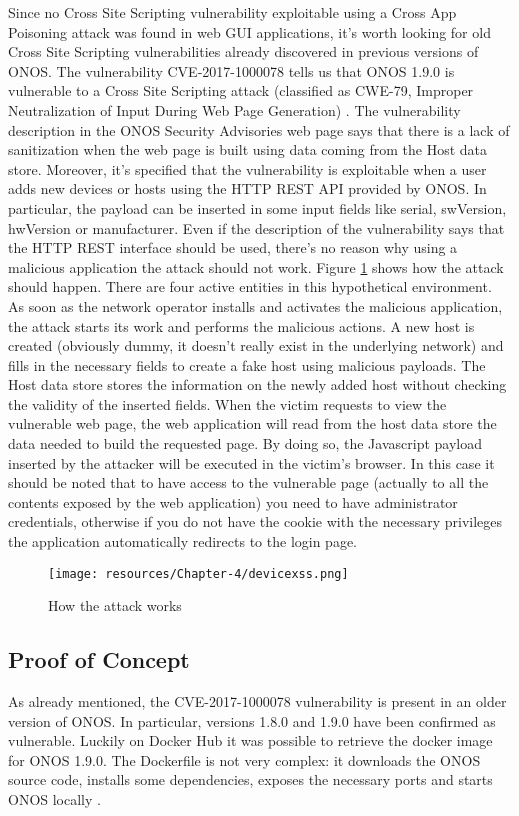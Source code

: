 Since no Cross Site Scripting vulnerability exploitable using a Cross App Poisoning attack was found in web GUI applications, it's worth looking for old Cross Site Scripting vulnerabilities already discovered in previous versions of ONOS. The vulnerability CVE-2017-1000078 tells us that ONOS 1.9.0 is vulnerable to a Cross Site Scripting attack (classified as CWE-79, Improper Neutralization of Input During Web Page Generation) \cite{CVE-2017-1000078}. The vulnerability description in the ONOS Security Advisories web page says that there is a lack of sanitization when the web page is built using data coming from the Host data store. Moreover, it's specified that the vulnerability is exploitable when a user adds new devices or hosts using the HTTP REST API provided by ONOS. In particular, the payload can be inserted in some input fields like serial, swVersion, hwVersion or manufacturer. Even if the description of the vulnerability says that the HTTP REST interface should be used, there's no reason why using a malicious application the attack should not work. Figure \ref{fig:devicexss} shows how the attack should happen. There are four active entities in this hypothetical environment. As soon as the network operator installs and activates the malicious application, the attack starts its work and performs the malicious actions. A new host is created (obviously dummy, it doesn't really exist in the underlying network) and fills in the necessary fields to create a fake host using malicious payloads. The Host data store stores the information on the newly added host without checking the validity of the inserted fields. When the victim requests to view the vulnerable web page, the web application will read from the host data store the data needed to build the requested page. By doing so, the Javascript payload inserted by the attacker will be executed in the victim's browser. In this case it should be noted that to have access to the vulnerable page (actually to all the contents exposed by the web application) you need to have administrator credentials, otherwise if you do not have the cookie with the necessary privileges the application automatically redirects to the login page.

\begin{figure}[h]
\caption{How the attack works}
\label{fig:devicexss}
\texttt{[image: resources/Chapter-4/devicexss.png]}
\centering
\end{figure}

\subsection{Proof of Concept}
As already mentioned, the CVE-2017-1000078 vulnerability is present in an older version of ONOS. In particular, versions 1.8.0 and 1.9.0 have been confirmed as vulnerable. Luckily on Docker Hub it was possible to retrieve the docker image for ONOS 1.9.0. The Dockerfile is not very complex: it downloads the ONOS source code, installs some dependencies, exposes the necessary ports and starts ONOS locally \cite{dockeronos}.

